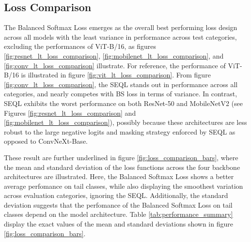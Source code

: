 \subsection{Loss Comparison}
The Balanced Softmax Loss emerges as the overall best performing loss design across all models with the least variance in performance across test categories, excluding the performances of ViT-B/16, as figures \ref{fig:resnet_lt_loss_comparison}, \ref{fig:mobilenet_lt_loss_comparison}, and \ref{fig:conv_lt_loss_comparison} illustrate. For reference, the performance of ViT-B/16 is illustrated in figure \ref{fig:vit_lt_loss_comparison}. From figure \ref{fig:conv_lt_loss_comparison}, the SEQL stands out in performance across all categories, and nearly competes with BS loss in terms of variance. In contrast, SEQL exhibits the worst performance on both ResNet-50 and MobileNetV2 (see Figures \ref{fig:resnet_lt_loss_comparison} and \ref{fig:mobilenet_lt_loss_comparison}), possibly because these architectures are less robust to the large negative logits and masking strategy enforced by SEQL as opposed to ConvNeXt-Base.

These result are further underlined in figure \ref{fig:loss_comparison_bars}, where the mean and standard deviation of the loss functions across the four backbone architectures are illustrated. Here, the Balanced Softmax Loss shows a better average perfomance on tail classes, while also displaying the smoothest variation across evaluation categories, ignoring the SEQL. Additionally, the standard deviation suggests that the perfomance of the Balanced Softmax Loss on tail classes depend on the model architecture. Table \ref{tab:performance_summary} display the exact values of the mean and standard deviations shown in figure \ref{fig:loss_comparison_bars}. 



